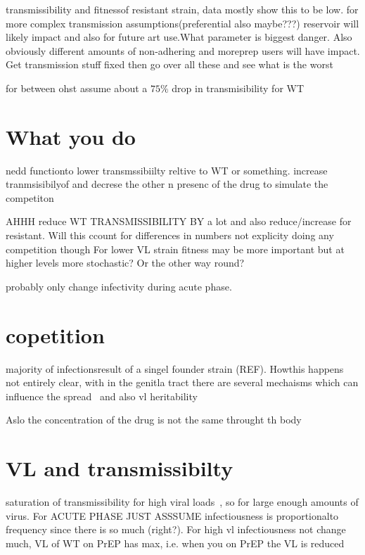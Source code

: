 \documentclass[DIV=15]{scrartcl}
\begin{document}
transmissibility and fitnessof resistant strain, data mostly show this to be low.  for more complex transmission assumptions(preferential also maybe???) reservoir will likely impact and also for future art use.What parameter is biggest danger. Also obviously different amounts of non-adhering and moreprep users will have impact. Get transmission stuff fixed then go over all these and see what is the worst

 
 
 for between ohst assume about a $75\% $ drop in transmisibility for WT~\cite{partners2012}
 
 
 
 
 \section{What you do}
 
nedd functionto lower transmssibiilty reltive to WT or  something. increase tranmsisibilyof and decrese the other n presenc of  the drug to  simulate the competiton 

AHHH
reduce WT TRANSMISSIBILITY BY  a lot  and also reduce/increase for resistant. Will this ccount for differences in numbers not explicity doing any competition though
For  lower VL strain fitness may be more important but at higher levels more stochastic? Or the other way round?
 
 probably only change infectivity during acute phase.
 


\section{copetition}
 majority of infectionsresult of a singel founder strain (REF). Howthis happens not entirely clear, with in the genitla tract there are several mechaisms which can influence the spread~\cite{joseph2015} and also vl heritability~\cite{fraser2014}
 
 Aslo the concentration of the drug is not the same throught th body~\cite{patterson2011}
 
 
 \section*{VL and transmissibilty}
 
saturation of transmissibility for high viral loads~\cite{fraser2007}, so for large enough amounts of virus. For  ACUTE PHASE JUST ASSSUME  	infectiousness  is  proportionalto frequency since there is  so much (right?). For  high vl infectiousness not change much, VL of WT on PrEP has max, i.e. when you on PrEP the VL is reduced 
 
\end{document}
